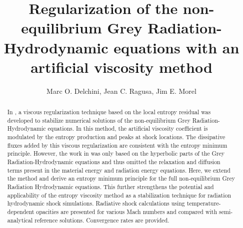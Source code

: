 \documentclass[times,doublespace]{fldauth}%
\begin{document}
%


\title{Regularization of the non-equilibrium Grey Radiation-Hydrodynamic equations with an artificial viscosity method}

\author{Marc O. Delchini, Jean C. Ragusa\corrauth{}, Jim E. Morel}

\address{Department of Nuclear Engineering, Texas A\&M University, College Station, TX 77843, USA}


\begin{abstract}
In \cite{our_jcp_radhy_paper}, 
a viscous regularization technique based on the local entropy residual was
developed to stabilize numerical solutions of the non-equilibrium Grey 
Radiation-Hydrodynamic equations. 
In this method, the artificial viscosity coefficient is modulated by the entropy production and peaks at shock locations. 
The dissipative fluxes added by this viscous regularization are consistent with the entropy minimum principle. 
However, the work in \cite{our_jcp_radhy_paper} was only based on the hyperbolic parts
of the Grey Radiation-Hydrodynamic equations and thus omitted the relaxation and diffusion terms 
present in the material energy and radiation energy equations. 
%
Here, we extend the method and derive an entropy minimum principle for the full non-equilibrium Grey Radiation Hydrodynamic 
equations. This further strengthens the potential and applicability of the entropy viscosity method as a stabilization technique 
for radiation hydrodynamic shock simulations. 
Radiative shock calculations using temperature-dependent opacities are presented for various Mach numbers and 
compared with semi-analytical reference solutions. Convergence rates are provided.
\end{abstract}


\end{document}
